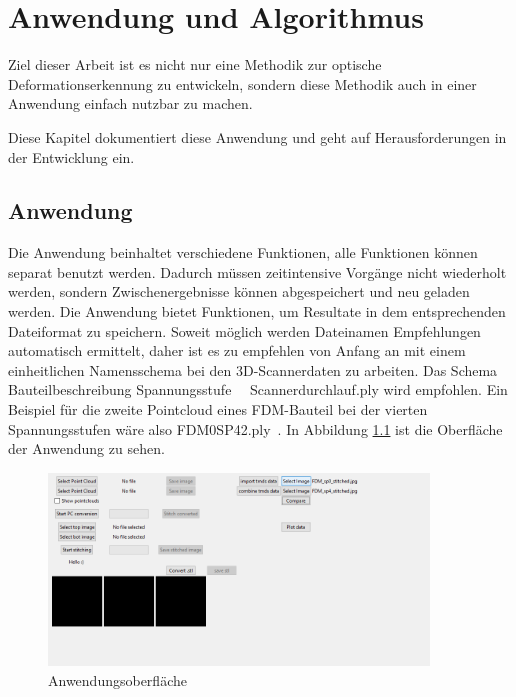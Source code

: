
\chapter{Anwendung und Algorithmus}

Ziel dieser Arbeit ist es nicht nur eine Methodik zur optische 
Deformationserkennung zu entwickeln, sondern diese Methodik auch in einer 
Anwendung einfach nutzbar zu machen. 

Diese Kapitel dokumentiert diese Anwendung und geht auf Herausforderungen 
in der Entwicklung ein.

\section{Anwendung}

Die Anwendung beinhaltet verschiedene Funktionen, alle Funktionen 
können separat benutzt werden. Dadurch müssen zeitintensive Vorgänge nicht 
wiederholt werden, sondern Zwischenergebnisse können abgespeichert und 
neu geladen werden.
Die Anwendung bietet Funktionen, um Resultate in dem entsprechenden Dateiformat zu 
speichern. Soweit möglich werden Dateinamen Empfehlungen automatisch ermittelt, 
daher ist es zu empfehlen von Anfang an mit einem einheitlichen Namensschema bei
den 3D-Scannerdaten zu arbeiten. 
Das Schema \glqq Bauteilbeschreibung \textunderscore Spannungsstufe\grqq~~
\textunderscore Scannerdurchlauf.ply
wird empfohlen. Ein Beispiel für die zweite Pointcloud eines FDM-Bauteil bei der
vierten Spannungsstufen wäre also \glqq FDM0\textunderscore SP4\textunderscore 2.ply\grqq~.
In Abbildung \ref{fig:software_screenshot} ist die Oberfläche der Anwendung zu sehen.

\begin{figure}[H]
    \centering
    \includegraphics[width=0.9\textwidth]{images/software_screenshot.png}
    \caption{Anwendungsoberfläche}
    \label{fig:software_screenshot}
\end{figure}

